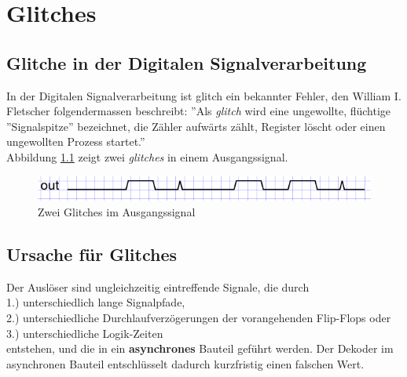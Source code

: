 
\chapter{Glitches}\label{chap.glitch}

\section{Glitche in der Digitalen Signalverarbeitung}\label{sect.glitch_def}
In der Digitalen Signalverarbeitung ist glitch ein bekannter Fehler, den William I. Fletscher folgendermassen beschreibt: ''Als \textit{glitch}  wird eine ungewollte, flüchtige ''Signalspitze'' bezeichnet, die Zähler aufwärts zählt, Register löscht oder einen ungewollten Prozess startet.'' \cite{F_glitches} \\


Abbildung \ref{fig.glitch.def} zeigt zwei \textit{glitches} in einem Ausgangssignal.\\

\begin{figure}[H]
	\centering
	\includegraphics[width=\textwidth]{images/glitch/def_glitch_1.png}
	\caption{Zwei Glitches im Ausgangssignal}
	\label{fig.glitch.def}
\end{figure}


\section{Ursache für Glitches}\label{sect.glitch_ursache}
Der Auslöser sind ungleichzeitig eintreffende Signale, die durch \\
1.) unterschiedlich lange Signalpfade, \\
2.) unterschiedliche Durchlaufverzögerungen der vorangehenden Flip-Flops oder \\
3.) unterschiedliche Logik-Zeiten \\
entstehen, und die in ein \textbf{asynchrones} Bauteil geführt werden. Der Dekoder im asynchronen Bauteil entschlüsselt dadurch kurzfristig einen falschen Wert. \\

